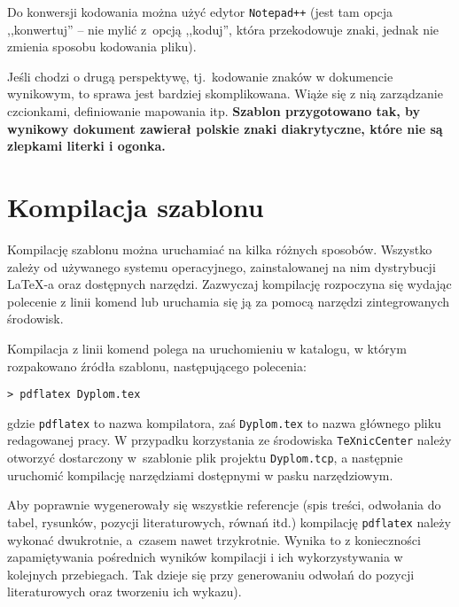 Do konwersji kodowania można użyć edytor \texttt{Notepad++} (jest tam opcja ,,konwertuj'' -- nie mylić z~opcją ,,koduj'', która przekodowuje znaki, jednak nie zmienia sposobu kodowania pliku).

Jeśli chodzi o drugą perspektywę, tj.\ kodowanie znaków w dokumencie wynikowym, to sprawa jest bardziej skomplikowana. Wiąże się z nią zarządzanie czcionkami, definiowanie mapowania itp. 
\textbf{Szablon przygotowano tak, by wynikowy dokument zawierał polskie znaki diakrytyczne, które nie są zlepkami literki i ogonka.}

\section{Kompilacja szablonu}
Kompilację szablonu można uruchamiać na kilka różnych sposobów. Wszystko zależy od używanego systemu operacyjnego, zainstalowanej na nim dystrybucji \LaTeX-a oraz dostępnych narzędzi. Zazwyczaj kompilację rozpoczyna się wydając polecenie z linii komend lub uruchamia się ją za pomocą narzędzi zintegrowanych środowisk.

Kompilacja z linii komend polega na uruchomieniu w katalogu, w którym rozpakowano źródła szablonu, następującego polecenia:
\begin{lstlisting}[basicstyle=\ttfamily]
> pdflatex Dyplom.tex
\end{lstlisting}
gdzie \texttt{pdflatex} to nazwa kompilatora, zaś \texttt{Dyplom.tex} to nazwa głównego pliku redagowanej pracy. 
W przypadku korzystania ze środowiska \texttt{TeXnicCenter} należy otworzyć dostarczony w~szablonie plik projektu \texttt{Dyplom.tcp}, a następnie uruchomić kompilację narzędziami dostępnymi w pasku narzędziowym.

Aby poprawnie wygenerowały się wszystkie referencje (spis treści, odwołania do tabel, rysunków, pozycji literaturowych, równań itd.) kompilację \texttt{pdflatex} należy wykonać dwukrotnie, a~czasem nawet trzykrotnie. Wynika to z konieczności zapamiętywania pośrednich wyników kompilacji i ich wykorzystywania w kolejnych przebiegach. Tak dzieje się przy generowaniu odwołań do pozycji literaturowych oraz tworzeniu ich wykazu). 

